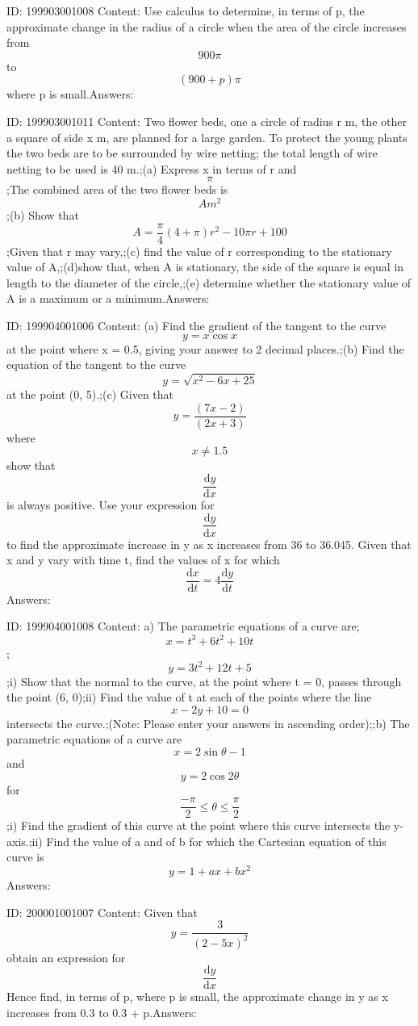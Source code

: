 \documentclass{article}
\begin{document}
ID: 199903001008
Content:
Use calculus to determine, in terms of p, the approximate change in the radius of a circle when the area of the circle increases from \[900\pi\] to\[ (900 + p)\pi\] where p is small.Answers:

ID: 199903001011
Content:
Two flower beds, one a circle of radius r m, the other a square of side x m, are planned for a large garden. To protect the young plants the two beds are to be surrounded by wire netting; the total length of wire netting to be used is 40 m.;(a)	Express x in terms of r and \[\pi\];The combined area of the two flower beds is \[Am^2\];(b)	Show that \[A=\frac{\pi}{4}(4+\pi)r^2-10\pi r+100\];Given that r may vary,;(c) find the value of r corresponding to the stationary value of A,;(d)show that, when A is stationary, the side of the square is equal in length to the diameter of the circle,;(e)	determine whether the stationary value of A is a maximum or a minimum.Answers:

ID: 199904001006
Content:
(a)	Find the gradient of the tangent to the curve \[y = x \cos x \] at the point where x = 0.5, giving your answer to 2 decimal places.;(b)	Find the equation of the tangent to the curve \[y=\sqrt{x^2-6x+25} \] at the point (0, 5).;(c)	Given that \[y=\frac{(7x-2)}{(2x+3)}\] where \[x\neq 1.5\] show that \[\frac{\mathrm{d} y}{\mathrm{d} x}\] is always positive. Use your expression for \[\frac{\mathrm{d} y}{\mathrm{d} x}\] to find the approximate increase in y as x increases from 36 to 36.045. Given that x and y vary with time t, find the values of x for which \[\frac{\mathrm{d} x}{\mathrm{d} t}=4\frac{\mathrm{d} y}{\mathrm{d} t}\]Answers:

ID: 199904001008
Content:
a) The parametric equations of a curve are; \[x=t^3+6t^2+10t\]; \[y=3t^2+12t+5\];i) Show that the normal to the curve, at the point where t = 0, passes through the point (6, 0);ii) Find the value of t at each of the points where the line \[x-2y +10 = 0\] intersects the curve.;(Note: Please enter your answers in ascending order);;b) The parametric equations of a curve are \[x=2\sin\theta-1\] and \[y=2\cos2\theta\] for \[\frac{-\pi }{2}\leq \theta\leq \frac{\pi }{2}\];i) Find the gradient of this curve at the point where this curve intersects the y-axis.;ii) Find the value of a and of b for which the Cartesian equation of this curve is \[y=1+ax+bx^2\]Answers:

ID: 200001001007
Content:
Given that \[y=\frac{3}{(2-5x)^2}\] obtain an expression for \[\frac{\mathrm{d} y}{\mathrm{d} x}\] Hence find, in terms of p, where p is small, the approximate change in y as x increases from 0.3 to 0.3 + p.Answers:
\end{document}
